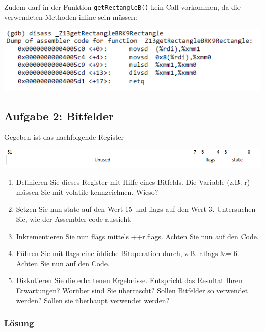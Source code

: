 \begin{enumerate}
  Zudem darf in der Funktion \texttt{getRectangleB()} kein Call vorkommen, da die verwendeten Methoden inline sein müssen:

\begin{center}
  \includegraphics[width=.8\linewidth]{900-Praktika/prak07/6.PNG}
\end{center}

\end{enumerate}

\subsection{Aufgabe 2: Bitfelder}

Gegeben ist das nachfolgende Register

\begin{center}
  \includegraphics[width=.8\linewidth]{900-Praktika/prak07/bitmuster.PNG}
\end{center}


\begin{enumerate}
  \item Definieren Sie dieses Register mit Hilfe eines Bitfelds. Die Variable (z.B. r) müssen Sie mit volatile kennzeichnen. Wieso?
  \item Setzen Sie nun state auf den Wert 15 und flags auf den Wert 3. Untersuchen Sie, wie der Assembler-code aussieht.
  \item Inkrementieren Sie nun flags mittels ++r.flags. Achten Sie nun auf den Code.
  \item Führen Sie mit flags eine übliche Bitoperation durch, z.B. r.flags \&= 6. Achten Sie nun auf den Code.
  \item Diskutieren Sie die erhaltenen Ergebnisse. Entspricht das Resultat Ihren Erwartungen? Worüber sind Sie überrascht? Sollen Bitfelder so verwendet werden? Sollen sie überhaupt verwendet werden?
\end{enumerate}

\subsubsection{Lösung}

